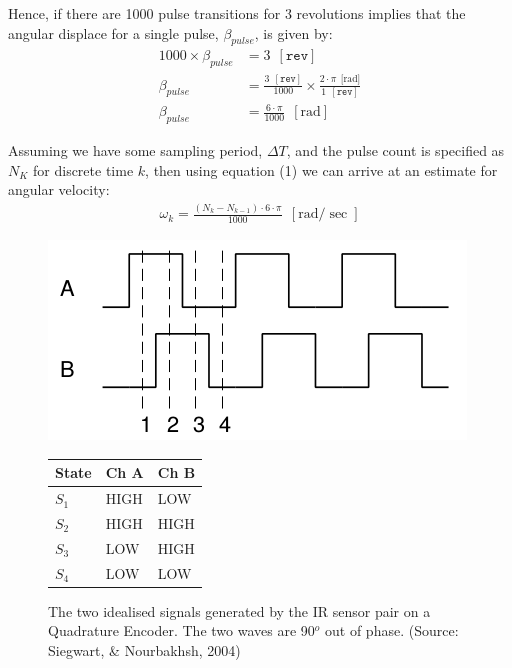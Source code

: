 \documentclass[a4paper]{article}
\begin{document}
Hence, if there are 1000 pulse transitions for 3 revolutions implies that the angular displace for a single pulse, $\beta_{pulse}$, is given by:
\begin{align}
1000 \times \beta_{pulse} &= 3 \ \ [\texttt{rev}] \nonumber\\
\beta_{pulse} &= \frac{3 \ \ [\texttt{rev}]}{1000} \times \frac{2 \cdot \pi \ \ {[\si{\radian}}]}{1 \ \ [\texttt{rev}]} \nonumber\\
\beta_{pulse} &= \frac{6 \cdot \pi}{1000} \ \ [\si{\radian}]
\end{align}

Assuming we have some sampling period, $\Delta T$, and the pulse count is specified as $N_K$ for discrete time $k$, then using equation (1) we can arrive at an estimate for angular velocity:
\begin{align}
\omega_k = \frac{(N_{k} - N_{k-1}) \cdot 6 \cdot \pi}{1000} \ \ [\si{\radian\per\sec}]
\end{align}


\begin{figure}[h]
\centering
\begin{minipage}{0.45\textwidth}
\centering
\includegraphics[scale=0.4]{optical_encoder_signal}
\caption{The two idealised signals generated by the IR sensor pair on a Quadrature Encoder. The two waves are 90$^o$ out of phase. (Source: Siegwart, \& Nourbakhsh, 2004)}
\end{minipage}
\hspace{1cm}
\begin{minipage}{0.45\textwidth}
\centering
{}
\begin{tabular}{lll}
\toprule
\textbf{State} & \textbf{Ch A} & \textbf{Ch B}\\
\midrule
$S_1$ & HIGH & LOW\\
$S_2$ & HIGH & HIGH\\
$S_3$ & LOW & HIGH\\
$S_4$ & LOW & LOW\\
\bottomrule
\end{tabular}
\end{minipage}
\end{figure}
\end{document}
